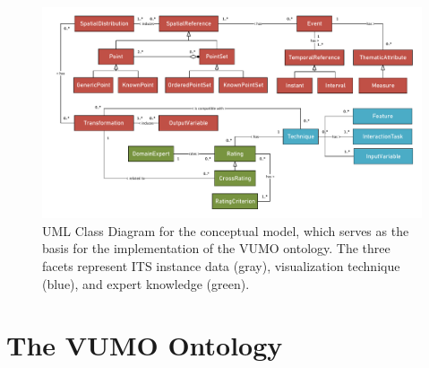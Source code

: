 \documentclass[]{interact}
\theoremstyle{plain}%
\theoremstyle{definition}
\theoremstyle{remark}
\theoremstyle{definition}
\begin{document}
%


\begin{figure}[hbt]
	\centering
	\includegraphics[width=1\textwidth]{images/uml2019}
	\caption[UML Class Diagram for the conceptual model]{UML Class Diagram for the conceptual model, which serves as the basis for the implementation of the VUMO ontology. The three facets represent ITS instance data (gray), visualization technique (blue), and expert knowledge (green).}
	\label{fig:uml}
\end{figure}


\section{The VUMO Ontology}\label{sec:vumo}
\end{document}
